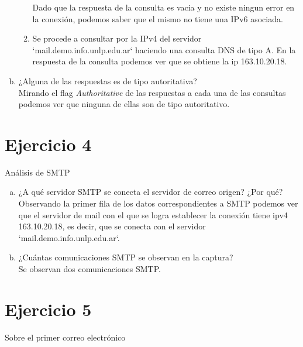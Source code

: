 \documentclass[osajnl,twocolumn,showpacs,superscriptaddress,10pt]{revtex4-1} %
\begin{document}
\begin{enumerate}[a)]
\begin{enumerate}[1.]
    Dado que la respuesta de la consulta es vacia y no existe ningun error en la conexión, podemos saber que el mismo no tiene una IPv6 asociada. \\

    \item Se procede a consultar por la IPv4 del servidor `mail.demo.info.unlp.edu.ar` haciendo una consulta DNS de tipo A. En la respuesta de la consulta podemos ver que se obtiene la ip 163.10.20.18. \\
  \end{enumerate}

  \item ¿Alguna de las respuestas es de tipo autoritativa? \\

  Mirando el flag \textit{Authoritative} de las respuestas a cada una de las consultas podemos ver que ninguna de ellas son de tipo autoritativo. \\
\end{enumerate}

\section{Ejercicio 4}

Análisis de SMTP

\begin{enumerate}[a)]
  \item ¿A qué servidor SMTP se conecta el servidor de correo origen? ¿Por qué? \\

  Observando la primer fila de los datos correspondientes a SMTP podemos ver que el servidor de mail con el que se logra establecer la conexión tiene ipv4 163.10.20.18, es decir, que se conecta con el servidor `mail.demo.info.unlp.edu.ar`. \\

  \item ¿Cuántas comunicaciones SMTP se observan en la captura? \\

  Se observan dos comunicaciones SMTP. \\
\end{enumerate}

\section{Ejercicio 5}

Sobre el primer correo electrónico \\
\end{document}
